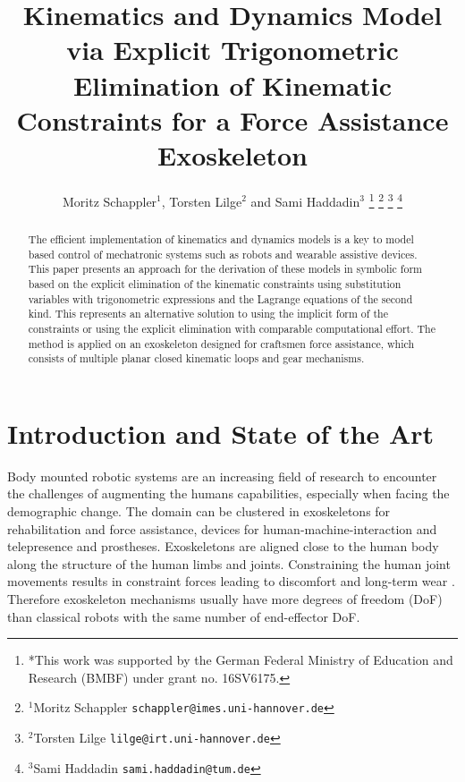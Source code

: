 \documentclass[letterpaper, 10 pt, conference]{ieeeconf}  %
\title{\LARGE \bf
Kinematics and Dynamics Model via Explicit Trigonometric Elimination of Kinematic Constraints for a Force Assistance Exoskeleton
}
\author{Moritz Schappler$^{1}$, Torsten Lilge$^{2}$ and Sami Haddadin$^{3}$%
\thanks{*This work was supported by the German Federal Ministry of Education and Research (BMBF) under grant no. 16SV6175.}%
\thanks{$^{1}$Moritz Schappler
        {\tt\small schappler@imes.uni-hannover.de}}%
\thanks{$^{2}$Torsten Lilge
    {\tt\small lilge@irt.uni-hannover.de}}%
\thanks{$^{3}$Sami Haddadin
        {\tt\small sami.haddadin@tum.de}}%
}
\begin{document}
\maketitle
\thispagestyle{empty}
\pagestyle{empty}


\begin{abstract}

The efficient implementation of kinematics and dynamics models is a key to model based control of mechatronic systems such as robots and wearable assistive devices.
This paper presents an approach for the derivation of these models in symbolic form based on the explicit elimination of the kinematic constraints using substitution variables with trigonometric expressions and the Lagrange equations of the second kind.
This represents an alternative solution to using the implicit form of the constraints or using the explicit elimination with comparable computational effort.
%
The method is applied on an exoskeleton designed for craftsmen force assistance, which consists of multiple planar closed kinematic loops and gear mechanisms.

\end{abstract}

\section{Introduction and State of the Art}

Body mounted robotic systems are an increasing field of research to encounter the challenges of augmenting the humans capabilities, especially when facing the demographic change.
The domain can be clustered in exoskeletons for rehabilitation and force assistance, devices for human-machine-interaction and telepresence and prostheses.
Exoskeletons are aligned close to the human body along the structure of the human limbs and joints.
Constraining the human joint movements results in constraint forces leading to discomfort and long-term wear \cite{Pons2008}.
%
Therefore exoskeleton mechanisms usually have more degrees of freedom (DoF) than classical robots with the same number of end-effector DoF.
\end{document}
